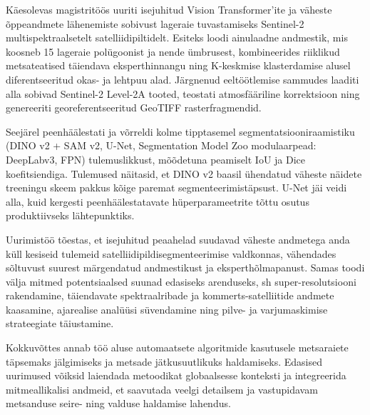 Käesolevas magistritöös uuriti isejuhitud Vision Transformer'ite ja väheste
õppeandmete lähenemiste sobivust lageraie tuvastamiseks Sentinel-2
multispektraalsetelt satelliidipiltidelt. Esiteks loodi ainulaadne andmestik,
mis koosneb 15 lageraie polügoonist ja nende ümbrusest, kombineerides riiklikud
metsateatised täiendava eksperthinnangu ning K-keskmise klasterdamise alusel
diferentseeritud okas- ja lehtpuu alad. Järgnenud eeltöötlemise sammudes laaditi
alla sobivad Sentinel-2 Level-2A tooted, teostati atmosfääriline korrektsioon
ning genereeriti georeferentseeritud GeoTIFF rasterfragmendid.

Seejärel peenhäälestati ja võrreldi kolme tipptasemel segmentatsiooniraamistiku
(DINO v2 + SAM v2, U-Net, Segmentation Model Zoo modulaarpead: DeepLabv3, FPN)
tulemuslikkust, mõõdetuna peamiselt IoU ja Dice koefitsiendiga. Tulemused
näitasid, et DINO v2 baasil ühendatud väheste näidete treeningu skeem
pakkus kõige paremat segmenteerimistäpsust. U-Net jäi veidi alla, kuid
kergesti peenhäälestatavate hüperparameetrite tõttu osutus produktiivseks
lähtepunktiks.

Uurimistöö tõestas, et isejuhitud peaahelad suudavad väheste andmetega anda
küll kesiseid tulemeid satelliidipildisegmenteerimise valdkonnas,
vähendades sõltuvust suurest märgendatud andmestikust ja eksperthõlmapanust.
Samas toodi välja mitmed potentsiaalsed suunad edasiseks arenduseks, sh
super-resolutsiooni rakendamine, täiendavate spektraalribade ja
kommerts-satelliitide andmete kaasamine, ajarealise analüüsi süvendamine ning
pilve- ja varjumaskimise strateegiate täiustamine.

Kokkuvõttes annab töö aluse automaatsete algoritmide kasutusele metsaraiete
täpsemaks jälgimiseks ja metsade jätkusuutlikuks haldamiseks. Edasised uurimused
võiksid laiendada metoodikat globaalsesse konteksti ja integreerida
mitmeallikalisi andmeid, et saavutada veelgi detailsem ja vastupidavam
metsanduse seire- ning valduse haldamise lahendus.